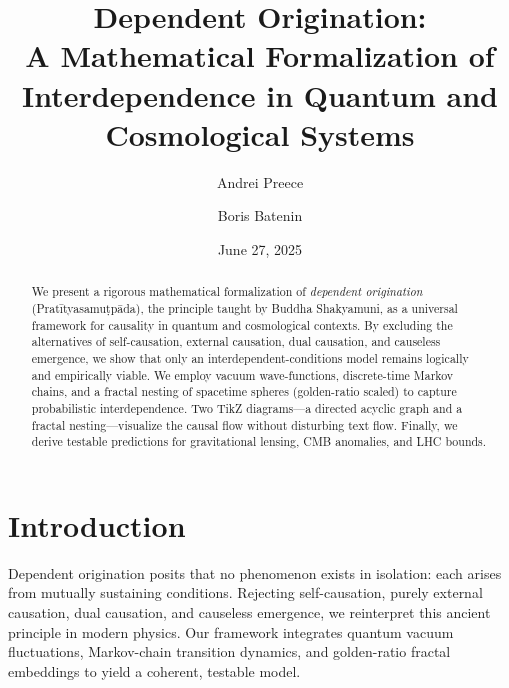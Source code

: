 \documentclass[%
  prd,
  twocolumn,
  10pt,
  nofootinbib,
  tightenlines,
  showkeys
]{revtex4-2}
\begin{document}
\title{Dependent Origination:\\
A Mathematical Formalization of Interdependence in Quantum and Cosmological Systems}

\author{Andrei Preece}
\author{Boris Batenin}

\date{June 27, 2025}

\begin{abstract}
We present a rigorous mathematical formalization of \emph{dependent origination}
(Pratītyasamuṭpāda), the principle taught by Buddha Shakyamuni, as a universal
framework for causality in quantum and cosmological contexts. By excluding the alternatives
of self-causation, external causation, dual causation, and causeless emergence, we show
that only an interdependent-conditions model remains logically and empirically viable.
We employ vacuum wave-functions, discrete-time Markov chains, and a fractal nesting
of spacetime spheres (golden-ratio scaled) to capture probabilistic interdependence.
Two TikZ diagrams—a directed acyclic graph and a fractal nesting—visualize
the causal flow without disturbing text flow. Finally, we derive testable predictions
for gravitational lensing, CMB anomalies, and LHC bounds.
\end{abstract}


\maketitle

\section{Introduction}
Dependent origination posits that no phenomenon exists in isolation: each arises
from mutually sustaining conditions. Rejecting self-causation, purely external
causation, dual causation, and causeless emergence, we reinterpret this ancient
principle in modern physics. Our framework integrates quantum vacuum fluctuations,
Markov-chain transition dynamics, and golden-ratio fractal embeddings to yield
a coherent, testable model.

\end{document}
